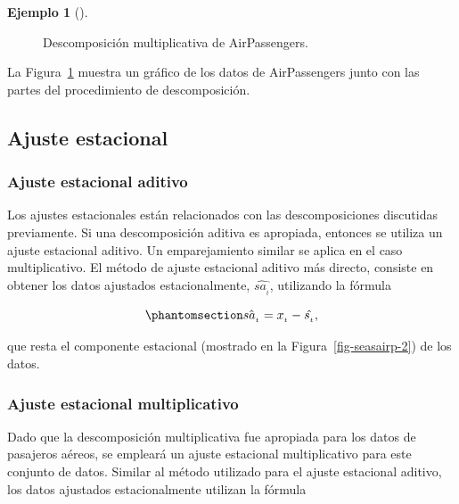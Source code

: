 \documentclass[
  us-letterpaper,
]{scrreprt}
\theoremstyle{plain}
\theoremstyle{definition}
\theoremstyle{definition}
\newtheorem{example}{Ejemplo}[chapter]
\theoremstyle{plain}
\theoremstyle{remark}
\begin{document}
\begin{example}[]
\begin{tcolorbox}
\begin{enumerate}
\begin{figure}[H]
{  }

  \caption{\label{fig-descmulp}Descomposición multiplicativa de
  AirPassengers.}

  \end{figure}%
\end{enumerate}

La Figura~\ref{fig-descmulp} muestra un gráfico de los datos de
AirPassengers junto con las partes del procedimiento de descomposición.

\end{tcolorbox}

\end{example}

\subsection{Ajuste estacional}\label{ajuste-estacional}

\subsubsection{Ajuste estacional
aditivo}\label{ajuste-estacional-aditivo}

Los ajustes estacionales están relacionados con las descomposiciones
discutidas previamente. Si una descomposición aditiva es apropiada,
entonces se utiliza un ajuste estacional aditivo. Un emparejamiento
similar se aplica en el caso multiplicativo. El método de ajuste
estacional aditivo más directo, consiste en obtener los datos ajustados
estacionalmente, \(\hat{sa_{_t}}\), utilizando la fórmula

\begin{equation}\phantomsection\label{eq-AEadd}{
\hat{sa_{_t}}=x_{_t}-\hat{s_{_t}},
}\end{equation}

que resta el componente estacional (mostrado en la
Figura~\ref{fig-seasairp-2}) de los datos.

\subsubsection{Ajuste estacional
multiplicativo}\label{ajuste-estacional-multiplicativo}

Dado que la descomposición multiplicativa fue apropiada para los datos
de pasajeros aéreos, se empleará un ajuste estacional multiplicativo
para este conjunto de datos. Similar al método utilizado para el ajuste
estacional aditivo, los datos ajustados estacionalmente utilizan la
fórmula
\end{document}

